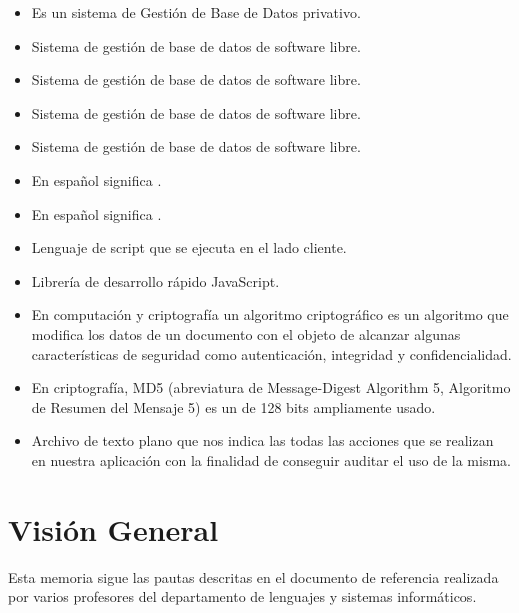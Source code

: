 \begin{itemize}
  \item {} Es un sistema de Gestión de Base de Datos
    privativo.
  \item {} Sistema de gestión de base de datos de
    software libre.
  \item {} Sistema de gestión de base de datos de
    software libre.
  \item {} Sistema de gestión de base de datos de
    software libre.
  \item {} Sistema de gestión de base de datos de
    software libre.
  \item {} En español significa
    .
  \item {} En español
    significa .
  \item {} Lenguaje de script que se ejecuta en el
    lado cliente.
  \item {} Librería de desarrollo rápido JavaScript.
  \item {} En computación y
    criptografía un algoritmo criptográfico es un algoritmo que
    modifica los datos de un documento con el objeto de alcanzar
    algunas características de seguridad como autenticación,
    integridad y confidencialidad.
  \item {} En criptografía, MD5 (abreviatura de
    Message-Digest Algorithm 5, Algoritmo de Resumen del Mensaje 5) es
    un  de 128 bits ampliamente
    usado.
  \item {} Archivo de texto plano que nos indica las
    todas las  acciones que se realizan en nuestra aplicación con la
    finalidad de conseguir auditar el uso de la misma.


\end{itemize}

\section{Visión General}
Esta memoria sigue las pautas descritas en el documento de referencia
 realizada por varios profesores del departamento de
lenguajes y sistemas informáticos.

